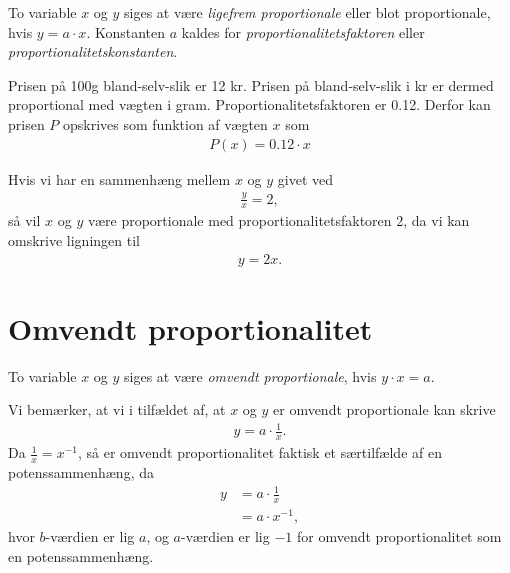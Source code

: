 \begin{defn}
	To variable $x$ og $y$ siges at være \textit{ligefrem proportionale} eller blot proportionale, hvis $y = a\cdot x$. Konstanten $a$ kaldes for \textit{proportionalitetsfaktoren} eller
	\textit{proportionalitetskonstanten}.
\end{defn}

\begin{exa}
	\label{exa:slik}
	Prisen på 100g bland-selv-slik er 12 kr. Prisen på bland-selv-slik i kr er dermed proportional med vægten i gram. Proportionalitetsfaktoren er 0.12. Derfor kan prisen $P$ opskrives som funktion af 		vægten $x$ som
 	\begin{align*}
 		P(x) = 0.12 \cdot x
 	\end{align*}
\end{exa}

\begin{exa}
	Hvis vi har en sammenhæng mellem $x$ og $y$ givet ved
	\begin{align*}
		\frac{y}{x} = 2,
	\end{align*}
	så vil $x$ og $y$ være proportionale med proportionalitetsfaktoren $2$, da vi kan omskrive ligningen til
	\begin{align*}
		y = 2x.
	\end{align*}
\end{exa}

\section*{Omvendt proportionalitet}

\begin{defn}
	To variable $x$ og $y$ siges at være \textit{omvendt proportionale}, hvis $y\cdot x = a$. 
\end{defn}
Vi bemærker, at vi i tilfældet af, at $x$ og $y$ er omvendt proportionale kan skrive
\begin{align*}
	y = a \cdot \frac{1}{x}.
\end{align*}
Da $\frac{1}{x} = x^{-1}$, så er omvendt proportionalitet faktisk et særtilfælde af en potenssammenhæng, da
\begin{align*}
	y &= a \cdot \frac{1}{x} \\
	&= a \cdot x^{-1},
\end{align*}
hvor $b$-værdien er lig $a$, og $a$-værdien er lig $-1$ for omvendt proportionalitet som en potenssammenhæng. 

